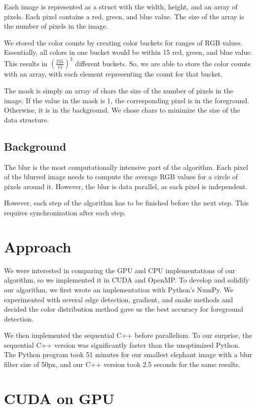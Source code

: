 \documentclass[12pt]{article}
\begin{document}
Each image is represented as a struct with the width, height, and an array of
pixels. Each pixel contains a red, green, and blue value. The size of the array
is the number of pixels in the image.

We stored the color counts by creating color buckets for ranges of RGB values.
Essentially, all colors in one bucket would be within 15 red, green, and blue
value. This results in $\left(\tfrac{255}{15}\right)^3$ different buckets. So,
we are able to store the color counts with an array, with each element
representing the count for that bucket.

The mask is simply an array of chars the size of the number of pixels in the
image. If the value in the mask is 1, the corresponding pixel is in the
foreground. Otherwise, it is in the background. We chose chars to minimize the
size of the data structure.

\subsection{Background}

The blur is the most computationally intensive part of the algorithm. Each
pixel of the blurred image needs to compute the average RGB values for a circle
of pixels around it. However, the blur is data parallel, as each pixel is
independent.

However, each step of the algorithm has to be finished before the next step.
This requires synchronization after each step.

\section{Approach}

We were interested in comparing the GPU and CPU implementations of our
algorithm, so we implemented it in CUDA and OpenMP. To develop and solidify our
algorithm, we first wrote an implementation with Python's NumPy. We
experimented with several edge detection, gradient, and snake methods and
decided the color distribution method gave us the best accuracy for foreground
detection.

We then implemented the sequential C++ before parallelism. To our surprise, the
sequential C++ version was significantly faster than the unoptimized Python.
The Python program took 51 minutes for our smallest elephant image with a blur
filter size of 50px, and our C++ version took 2.5 seconds for the same results.

\section{CUDA on GPU}
\end{document}

